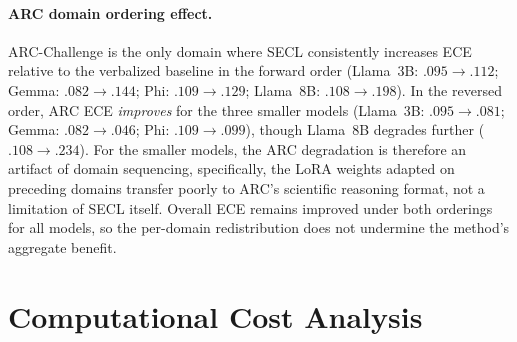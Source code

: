 \begin{table}[htbp]
\centering
\small
{}%
\caption{Per-domain ECE for original ($\mathcal{O}$) vs.\ reversed 
($\mathcal{R}$) domain order.}
\label{tab:domain_order_perdomain}
\end{table}

\paragraph{ARC domain ordering effect.}
ARC-Challenge is the only domain where SECL consistently increases ECE
relative to the verbalized baseline in the forward order
(Llama~3B: $.095 \to .112$; Gemma: $.082 \to .144$; Phi: $.109 \to .129$; Llama~8B: $.108 \to .198$).
In the reversed order, ARC ECE \emph{improves} for the three smaller models
(Llama~3B: $.095 \to .081$; Gemma: $.082 \to .046$; Phi: $.109 \to .099$),
though Llama~8B degrades further ($.108 \to .234$).
For the smaller models, the ARC degradation is therefore an artifact of domain sequencing, specifically,
the LoRA weights adapted on preceding domains transfer poorly to ARC's
scientific reasoning format, not a limitation of SECL itself.
Overall ECE remains improved under both orderings for all models,
so the per-domain redistribution does not undermine the method's aggregate benefit.

\section{Computational Cost Analysis} \label{app:cost}

